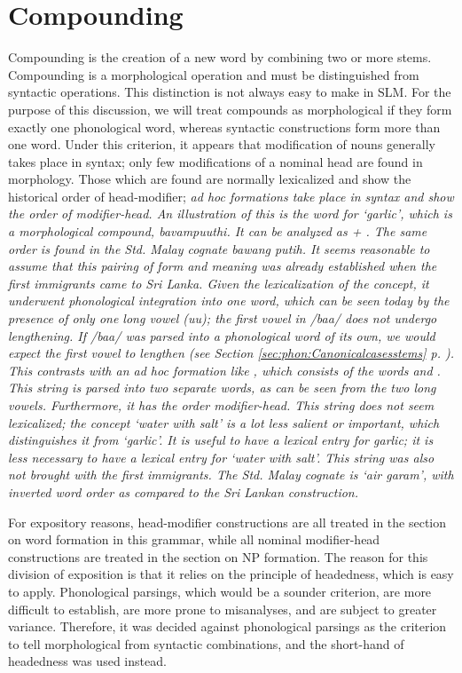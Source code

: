 \section{Compounding}\label{sec:wofo:Compounding}
Compounding is the creation of a new word by combining two or more stems. Compounding is a morphological operation and must be distinguished from syntactic operations. This distinction is not always easy to make in SLM. For the purpose of this discussion, we will treat compounds as morphological if they form exactly one phonological word, whereas syntactic constructions form more than one word. Under this criterion, it appears that  modification of nouns generally takes place in syntax; only few modifications of a nominal head are found in morphology. Those which are found are normally lexicalized and show the historical order of head-modifier; \em ad hoc \em formations take place in syntax and show the order of modifier-head. An illustration of this is the word for `garlic', which is a morphological compound, \em bavampuuthi\em. It can be analyzed as  + . The same order is found in the Std. Malay cognate \em  bawang putih\em. It seems reasonable to assume that this pairing of form and meaning was already established when the first immigrants came to Sri Lanka. Given the lexicalization of the concept, it underwent phonological integration into one word, which can be seen today by the presence of only one long vowel (uu); the first vowel in /ba\V a\ng/ does not undergo lengthening. If /ba\V a\ng/ was parsed into a phonological word of its own, we would expect the first vowel to lengthen (see Section \ref{sec:phon:Canonicalcasesstems} p. \pageref{sec:phon:Canonicalcasesstems}). This contrasts with an ad hoc formation like , which consists of the words  and . This string is parsed into two separate words, as can be seen from the two long vowels. Furthermore, it has the order modifier-head. This string does not seem lexicalized; the concept `water with salt' is a lot less salient or important, which distinguishes it from `garlic'. It is useful to have a lexical entry for garlic; it is less necessary to have a lexical entry for `water with salt'. This string was also not brought with the first immigrants. The Std. Malay cognate is `air garam', with inverted word order as compared to the Sri Lankan construction.

For expository reasons, head-modifier constructions are all treated in the section on word formation in this grammar, while all nominal modifier-head constructions are treated in the section on NP formation. The reason for this division of exposition is that it relies on the principle of headedness, which is easy to apply. Phonological parsings, which would be a sounder criterion, are more difficult to establish, are more prone to misanalyses, and are subject to greater variance. Therefore, it was decided against phonological parsings as the criterion to tell morphological from syntactic combinations, and the short-hand of headedness was used instead.


